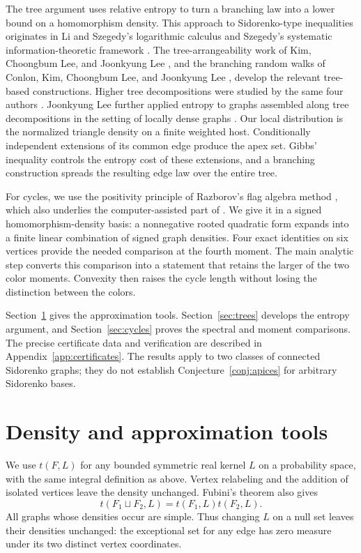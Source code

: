 \documentclass[11pt,a4paper]{article}
\theoremstyle{remark}
\numberwithin{equation}{section}
\begin{document}
The tree argument uses relative entropy to turn a branching law
into a lower bound on a homomorphism density. This approach to
Sidorenko-type inequalities originates in Li and Szegedy's
logarithmic calculus \cite{LiSzegedy} and Szegedy's systematic
information-theoretic framework \cite{SzegedyEntropy}. The
tree-arrangeability work of Kim, Choongbum Lee, and Joonkyung Lee
\cite{KLL}, and the branching random walks of Conlon, Kim,
Choongbum Lee, and Joonkyung Lee \cite{CKLL}, develop the relevant
tree-based constructions. Higher tree decompositions were studied
by the same four authors \cite{CKLLHigher}.
Joonkyung Lee further applied entropy to graphs assembled along
tree decompositions in the setting of locally dense graphs
\cite{LeeLocal}.
Our local distribution is the normalized triangle density on a
finite weighted host. Conditionally independent extensions of its
common edge produce the apex set. Gibbs' inequality controls the
entropy cost of these extensions, and a branching construction
spreads the resulting edge law over the entire tree.

For cycles, we use the positivity principle of Razborov's flag
algebra method \cite{Razborov}, which also underlies the
computer-assisted part of \cite{GLLV}. We give it in a signed
homomorphism-density basis: a nonnegative rooted quadratic form
expands into a finite linear combination of signed graph densities.
Four exact identities on six vertices provide the needed comparison
at the fourth moment. The main analytic step converts this
comparison into a statement that retains the larger of the two
color moments. Convexity then raises the cycle length without
losing the distinction between the colors.

Section~\ref{sec:prelim} gives the approximation tools.
Section~\ref{sec:trees} develops the entropy argument, and
Section~\ref{sec:cycles} proves the spectral and moment comparisons.
The precise certificate data and verification are described in
Appendix~\ref{app:certificates}. The results apply to two classes
of connected Sidorenko graphs; they do not establish
Conjecture~\ref{conj:apices} for arbitrary Sidorenko bases.

\section{Density and approximation tools}\label{sec:prelim}

We use $t(F,L)$ for any bounded symmetric real kernel $L$ on a
probability space, with the same integral definition as above.
Vertex relabeling and the addition of isolated vertices leave the
density unchanged. Fubini's theorem also gives
\[
 t(F_1\sqcup F_2,L)=t(F_1,L)t(F_2,L).
\]
All graphs whose densities occur are simple. Thus changing $L$ on
a null set leaves their densities unchanged: the exceptional set
for any edge has zero measure under its two distinct vertex
coordinates.
\end{document}
